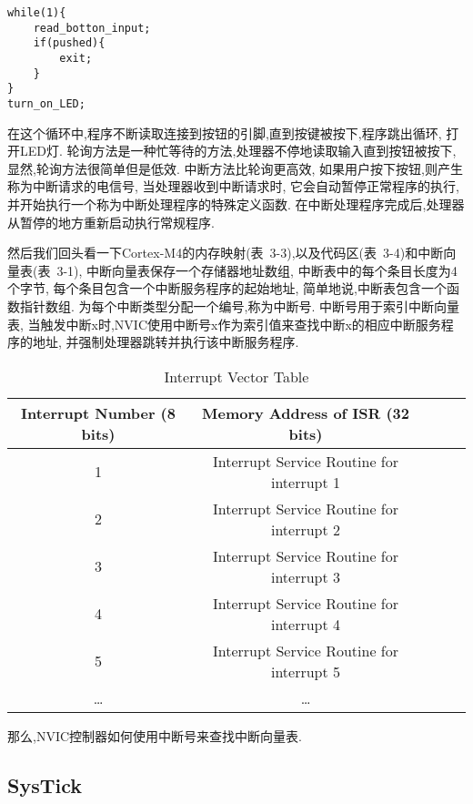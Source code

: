\begin{lstlisting}[language={[ANSI]C}]
while(1){
    read_botton_input;
    if(pushed){
        exit;
    }
}
turn_on_LED;
\end{lstlisting}

在这个循环中,程序不断读取连接到按钮的引脚,直到按键被按下,程序跳出循环,
打开LED灯.
轮询方法是一种忙等待的方法,处理器不停地读取输入直到按钮被按下,
显然,轮询方法很简单但是低效.
中断方法比轮询更高效,
如果用户按下按钮,则产生称为中断请求的电信号,
当处理器收到中断请求时,
它会自动暂停正常程序的执行,
并开始执行一个称为中断处理程序的特殊定义函数.
在中断处理程序完成后,处理器从暂停的地方重新启动执行常规程序.

然后我们回头看一下Cortex-M4的内存映射(表~3-3),以及代码区(表~3-4)和中断向量表(表~3-1),
中断向量表保存一个存储器地址数组,
中断表中的每个条目长度为4个字节,
每个条目包含一个中断服务程序的起始地址,
简单地说,中断表包含一个函数指针数组.
为每个中断类型分配一个编号,称为中断号. 
中断号用于索引中断向量表,
当触发中断x时,NVIC使用中断号x作为索引值来查找中断x的相应中断服务程序的地址,
并强制处理器跳转并执行该中断服务程序.
\begin{table}[htbp]
    \caption{  Interrupt Vector Table }\label{tab:table1}
    \vspace{0.5em}\centering\wuhao
    \begin{tabular}{ccccc}
    \toprule[1.5pt]
    Interrupt Number (8 bits) & Memory Address of ISR (32 bits) \\
    \midrule[1pt]
    1    &      Interrupt Service Routine for interrupt 1 \\
    2    &      Interrupt Service Routine for interrupt 2 \\
    3    &      Interrupt Service Routine for interrupt 3 \\
    4    &      Interrupt Service Routine for interrupt 4 \\
    5    &      Interrupt Service Routine for interrupt 5 \\
    \dots &     \dots \\
  
    \bottomrule[1.5pt]
    \end{tabular}
    \vspace{\baselineskip}
    \end{table}

那么,NVIC控制器如何使用中断号来查找中断向量表.


\subsection{SysTick}
